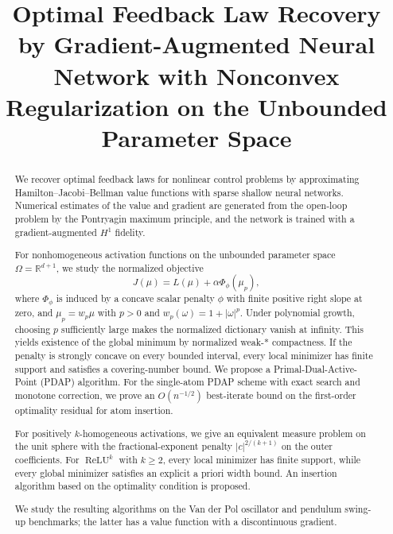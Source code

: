 \documentclass[11pt]{amsart}
\title[Optimal feedback law recovery]{Optimal Feedback Law Recovery by
Gradient-Augmented Neural Network with Nonconvex Regularization on the
Unbounded Parameter Space}
\theoremstyle{definition}
\theoremstyle{remark}
\DeclareMathOperator{\relu}{ReLU}
\newcommand{\reluk}{\relu^{k}}
\begin{document}
\begin{abstract}
We recover optimal feedback laws for nonlinear control problems by
approximating Hamilton--Jacobi--Bellman value functions with sparse shallow
neural networks. Numerical estimates of the value and gradient are
generated from the open-loop problem by the Pontryagin maximum principle, and
the network is trained with a gradient-augmented $H^1$ fidelity. 

For nonhomogeneous activation functions on
the unbounded parameter space $\Omega=\mathbb R^{d+1}$, we study the normalized objective
\begin{equation*}
	J(\mu)=L(\mu)+\alpha\Phi_\phi(\mu_p),
\end{equation*}
where $\Phi_\phi$ is induced by a concave scalar penalty $\phi$ with finite positive right slope at zero,
and $\mu_p=w_p\mu$ with $p>0$ and $w_p(\omega)=1+|\omega|^p$. 
Under polynomial growth, choosing $p$ sufficiently large makes the normalized dictionary vanish at infinity.
This yields existence of the global minimum by normalized weak-* compactness. 
If the penalty is strongly concave on every bounded interval, every local minimizer
has finite support and satisfies a covering-number bound. 
We propose a Primal-Dual-Active-Point (PDAP) algorithm.
For the single-atom PDAP scheme with exact search and monotone correction,
we prove an $O(n^{-1/2})$ best-iterate bound on the first-order optimality residual for atom insertion.

For positively $k$-homogeneous activations, we give an
equivalent measure problem on the unit sphere with the fractional-exponent penalty
$|c|^{2/(k+1)}$ on the outer coefficients. For $\reluk$ with $k\ge2$, every local minimizer has finite support,
while every global minimizer satisfies an explicit a priori width bound. 
An insertion algorithm based on the optimality condition is proposed.

We study the resulting algorithms on the Van der Pol oscillator and pendulum
swing-up benchmarks; the latter has a value function with a discontinuous gradient.
\end{abstract}
\maketitle
\tableofcontents
\end{document}
